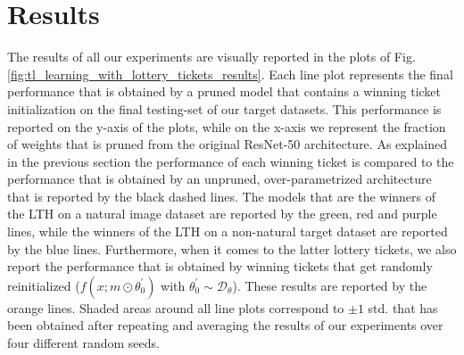 \section{Results}
\label{sec:results}
The results of all our experiments are visually reported in the plots of Fig. \ref{fig:tl_learning_with_lottery_tickets_results}. Each line plot represents the final performance that is obtained by a pruned model that contains a winning ticket initialization on the final testing-set of our target datasets. This performance is reported on the y-axis of the plots, while on the x-axis we represent the fraction of weights that is pruned from the original ResNet-50 architecture. As explained in the previous section the performance of each winning ticket is compared to the performance that is obtained by an unpruned, over-parametrized architecture that is reported by the black dashed lines. The models that are the winners of the LTH on a natural image dataset are reported by the green, red and purple lines, while the winners of the LTH on a non-natural target dataset are reported by the blue lines. Furthermore, when it comes to the latter lottery tickets, we also report the performance that is obtained by winning tickets that get randomly reinitialized ($f(x;m\odot\theta^{'}_{0})$ with $\theta^{'}_{0} \sim \mathcal{D}_\theta$). These results are reported by the orange lines. Shaded areas around all line plots correspond to $\pm 1$ std. that has been obtained after repeating and averaging the results of our experiments over four different random seeds.


